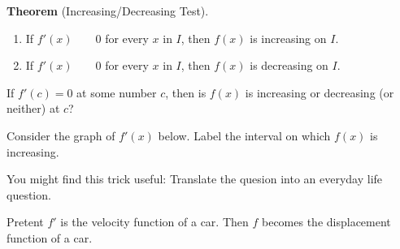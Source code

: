 \documentclass[../main.tex]{subfiles}
\begin{document}
\begin{mdframed}[style=withref]
  \textbf{Theorem} (Increasing/Decreasing Test). 
  \begin{enumerate}[label=(\alph*)]
    \item If \(f'(x) \hspace{2em} 0\) for every \(x\) in \(I\), then \(f(x)\) is increasing on \(I\).
    \item If \(f'(x) \hspace{2em} 0\) for every \(x\) in \(I\), then \(f(x)\) is decreasing on \(I\).
  \end{enumerate}

\end{mdframed}

\faComments{} If \(f'(c) = 0\) at some number \(c\), then is \(f(x)\) is increasing or decreasing (or neither) at \(c\)?
\vspace{1cm}

\begin{example}
  Consider the graph of \(f'(x)\) below. Label the interval on which \(f(x)\) is increasing. 

  \begin{minipage}{0.4\textwidth}
  \end{minipage}
  \begin{minipage}{0.59\textwidth}
    \vspace{-1in}
    \footnotesize
    You might find this trick useful: Translate the quesion into an everyday life question.
    \medskip

    Pretent \(f'\) is the velocity function of a car. Then \(f\) becomes the displacement function of a car. 
  \end{minipage}

\end{example}
\end{document}
